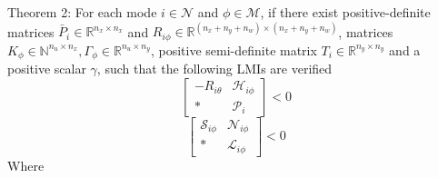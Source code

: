 \documentclass[conference]{IEEEtran}
\begin{document}
Theorem 2: For each mode $i\in\mathcal{N}$ and $\phi\in\mathcal{M}$, if there exist positive-definite matrices $\bar{P}_{i}\in\mathbb{R}^{n_x\times n_x}$ and $R_{i\phi}\in \mathbb{R}^{(n_x+n_y+n_w)\times(n_x+n_y+n_w)}$, matrices $K_{\phi}\in\mathbb{N}^{n_u\times n_x}, \varGamma_{\phi}\in \mathbb{R}^{n_u\times n_y}$, positive semi-definite matrix $T_{i}\in\mathbb{R}^{n_y\times n_y}$ and a positive scalar $\gamma$, such that the following LMIs are verified
\begin{equation} \label{condition_2_1}
	\begin{bmatrix}
	-R_{i\theta}&\mathscr{H}_{i\phi}\\
	*&\mathscr{P}_{i}
	\end{bmatrix}<0
\end{equation}
\begin{equation} \label{condition_2_2}
	\begin{bmatrix}
	\mathscr{S}_{i\phi}&\mathscr{N}_{i\phi}\\
	*&\mathscr{L}_{i\phi}
	\end{bmatrix}<0
\end{equation}
Where 
\end{document}
